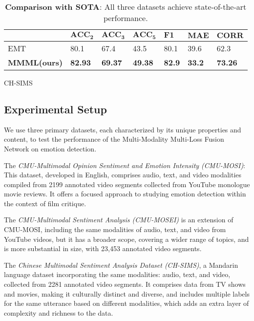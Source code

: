 \documentclass[11pt]{article}
\begin{document}
\begin{table*}
\begin{subtable}{\textwidth}
\centering
\small
\setlength{\tabcolsep}{3pt}
\renewcommand{\arraystretch}{1.2}
\begin{tabular}{lllllll}
\hline
 & $\mathbf{ACC_2}$ & $\mathbf{ACC_3}$ & $\mathbf{ACC_5}$ & $\mathbf{F1}$ & $\mathbf{MAE}$ & $\mathbf{CORR}$ \\ \hline
EMT & 80.1 & 67.4 & 43.5 & 80.1 & 39.6 & 62.3 \\ \hline
\textbf{MMML(ours)} & \textbf{82.93} & \textbf{69.37} & \textbf{49.38} & \textbf{82.9} & \textbf{33.2} & \textbf{73.26} \\ \hline
\end{tabular}
\caption{CH-SIMS}
\label{tab:CH-SIMS1}
\end{subtable}
\caption{\textbf{Comparison with SOTA}: All three datasets achieve state-of-the-art performance.}
\label{tab:Performance1}
\end{table*}
 
\subsection{Experimental Setup}
We use three primary datasets, each characterized by its unique properties and content, to test the performance of the Multi-Modality Multi-Loss Fusion Network on emotion detection.  

The {\it CMU-Multimodal Opinion Sentiment and Emotion Intensity (CMU-MOSI)}\cite{zadeh2016mosi}: This dataset, developed in English, comprises audio, text, and video modalities compiled from 2199 annotated video segments collected from YouTube monologue movie reviews.  It offers a focused approach to studying emotion detection within the context of film critique.   

The {\it CMU-Multimodal Sentiment Analysis (CMU-MOSEI)}\cite{bagher-zadeh-etal-2018-multimodal} is an extension of CMU-MOSI, including the same modalities of audio, text, and video from YouTube videos, but it has a broader scope, covering a wider range of topics, and is more substantial in size, with 23,453 annotated video segments.

The {\it Chinese Multimodal Sentiment Analysis Dataset (CH-SIMS)}\cite{yu-etal-2020-ch}, a Mandarin language dataset incorporating the same modalities: audio, text, and video, collected from 2281 annotated video segments. It comprises data from TV shows and movies, making it culturally distinct and diverse, and includes multiple labels for the same utterance based on different modalities, which adds an extra layer of complexity and richness to the data.
\end{document}
